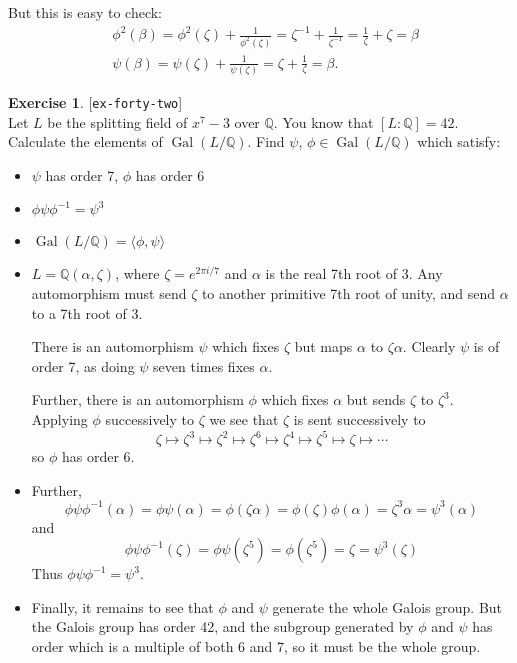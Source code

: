 \documentclass{amsart}
\newcommand{\Gal}       {\operatorname{Gal}}
\newcommand{\Q}         {{\mathbb{Q}}}
\newcommand{\al}        {\alpha}
\newcommand{\bt}        {\beta}
\newcommand{\zt}        {\zeta}
\renewcommand{\:}{\colon}
\newcommand{\lastexlabel}{}
\newcommand{\exlabel}[1]{
 \global\def\lastexlabel{#1}\label{#1}[\texttt{#1}]\ \\
}
\newcommand{\exlabel}[1]{
 \global\def\lastexlabel{#1}\label{#1}
}
\newenvironment{solution}{\SolutionInline}{\endSolutionInline}
\theoremstyle{definition}
\newtheorem{exercise}{Exercise}[section]
\renewenvironment{solution}{\SolutionAtEnd}{\endSolutionAtEnd}
\begin{document}
\begin{solution}
\begin{itemize}
  But this is easy to check:
  \begin{eqnarray*}
  &\phi^2(\bt)=\phi^2(\zt)+\frac{1}{\phi^2(\zt)}=\zt^{-1}+\frac{1}{\zt^{-1}}=\frac{1}{\zt}+\zt=\bt\\
  &\psi(\bt)=\psi(\zt)+\frac{1}{\psi(\zt)}=\zt+\frac{1}{\zt}=\bt.
  \end{eqnarray*}
 \end{itemize}
\end{solution}
\begin{exercise}\exlabel{ex-forty-two}
 Let $L$ be the splitting field of $x^7-3$ over $\Q$. You know that
 $[L:\Q]=42$. Calculate the elements of $\Gal(L/\Q)$.
 Find $\psi$, $\phi\in\Gal(L/\Q)$ which satisfy:
 \begin{itemize}
  \item $\psi$ has order 7, $\phi$ has order 6
  \item $\phi\psi\phi^{-1}=\psi^3$
 \item $\Gal(L/\Q)=\langle\phi,\psi\rangle$
 \end{itemize}
\end{exercise}
\begin{solution}
 \begin{itemize}
  \item $L=\Q(\al,\zt)$, where $\zt=e^{{2\pi i}/{7}}$ and
  $\al$ is the real 7th root of 3. Any automorphism must send $\zt$ to
  another primitive 7th root of unity, and send $\al$ to a 7th root
  of 3. 

  There is an automorphism
  $\psi$ which fixes $\zt$ but maps $\al$ to $\zt\al$. Clearly
  $\psi$ is of order 7, as doing $\psi$ seven times fixes $\al$.

  Further, there is an automorphism $\phi$ which fixes $\al$ but sends
  $\zt$ to $\zt^3$. Applying $\phi$ successively to $\zt$ we see that
  $\zt$ is sent successively to
  $$\zt\mapsto\zt^3\mapsto\zt^2\mapsto\zt^6\mapsto\zt^4\mapsto\zt^5\mapsto\zt\mapsto\cdots$$
  so $\phi$ has order 6.
  \item
  Further, 
  $$\phi\psi\phi^{-1}(\al)=\phi\psi(\al)=\phi(\zt\al)=\phi(\zt)\phi(\al)=\zt^3\al=\psi^3(\al)$$
  and
  $$\phi\psi\phi^{-1}(\zt)=\phi\psi(\zt^5)=\phi(\zt^5)=\zt=\psi^3(\zt)$$
  Thus $\phi\psi\phi^{-1}=\psi^3$.
  \item
  Finally, it remains to see that $\phi$ and $\psi$ generate the whole Galois
  group. But the Galois group has order 42, and the subgroup generated by
  $\phi$ and $\psi$ has order which is a multiple of both 6 and 7, so it must
  be the whole group.
 \end{itemize}
\end{solution}
\end{document}
